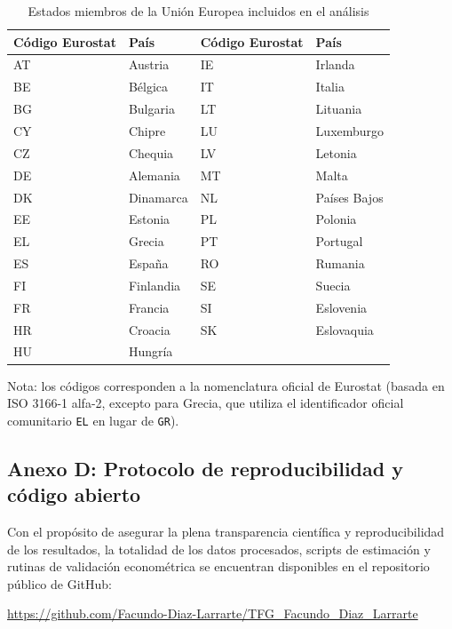 \documentclass[12pt,a4paper]{article}
\begin{document}
\begin{table}[H]
\centering
\caption{Estados miembros de la Unión Europea incluidos en el análisis}
\label{tab:anexo-paises}
\small
\begin{tabular}{llll}
\toprule
\textbf{Código Eurostat} & \textbf{País} & \textbf{Código Eurostat} & \textbf{País} \\
\midrule
AT & Austria & IE & Irlanda \\
BE & Bélgica & IT & Italia \\
BG & Bulgaria & LT & Lituania \\
CY & Chipre & LU & Luxemburgo \\
CZ & Chequia & LV & Letonia \\
DE & Alemania & MT & Malta \\
DK & Dinamarca & NL & Países Bajos \\
EE & Estonia & PL & Polonia \\
EL & Grecia & PT & Portugal \\
ES & España & RO & Rumania \\
FI & Finlandia & SE & Suecia \\
FR & Francia & SI & Eslovenia \\
HR & Croacia & SK & Eslovaquia \\
HU & Hungría & & \\
\bottomrule
\end{tabular}
\begin{flushleft}
\footnotesize Nota: los códigos corresponden a la nomenclatura oficial de Eurostat (basada en ISO 3166-1 alfa-2, excepto para Grecia, que utiliza el identificador oficial comunitario \texttt{EL} en lugar de \texttt{GR}).
\end{flushleft}
\end{table}

\subsection*{Anexo D: Protocolo de reproducibilidad y código abierto}

\label{anexo:reproducibilidad}

Con el propósito de asegurar la plena transparencia científica y reproducibilidad de los resultados, la totalidad de los datos procesados, scripts de estimación y rutinas de validación econométrica se encuentran disponibles en el repositorio público de GitHub:

\begin{center}

\url{https://github.com/Facundo-Diaz-Larrarte/TFG_Facundo_Diaz_Larrarte}

\end{center}
\end{document}

